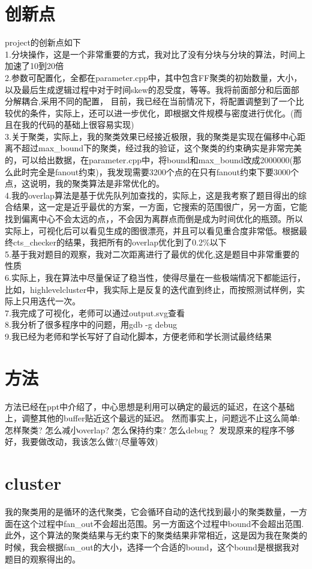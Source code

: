 \documentclass[12pt]{ctexart}
\begin{document}
\section{创新点}
project的创新点如下\\
1.分块操作，这是一个非常重要的方式，我对比了没有分块与分块的算法，时间上加速了10到20倍 \\
2.参数可配置化，全都在parameter.cpp中，其中包含FF聚类的初始数量，大小，以及最后生成逻辑过程中对于时间skew的忍受度，等等。我将前面部分和后面部分解耦合,采用不同的配置，
目前，我已经在当前情况下，将配置调整到了一个比较优的条件，实际上，还可以进一步优化，即根据文件规模与密度进行优化。(而且在我的代码的基础上很容易实现)\\
3.关于聚类，实际上，我的聚类效果已经接近极限，我的聚类是实现在偏移中心距离不超过max\_bound下的聚类，经过我的验证，这个聚类的约束确实是非常完美的，可以给出数据，在parameter.cpp中，将bound和max\_bound改成2000000(那么此时完全是fanout约束)，我发现需要3200个点的在只有fanout约束下要3000个点，这说明，我的聚类算法是非常优化的。\\
4.我的overlap算法是基于优先队列加查找的，实际上，这是我考察了题目得出的综合结果，这一定是近乎最优的方案，一方面，它搜索的范围很广，另一方面，它能找到偏离中心不会太远的点，，不会因为离群点而倒是成为时间优化的瓶颈。所以实际上，可视化后可以看见生成的图很漂亮，并且可以看见重合度非常低。根据最终cts\_checker的结果，我把所有的overlap优化到了0.2\%以下 \\
5.基于我对题目的观察，我对二次距离进行了最优的优化,这是题目中非常重要的性质    \\
6.实际上，我在算法中尽量保证了稳当性，使得尽量在一些极端情况下都能运行，比如，highlevelcluster中，我实际上是反复的迭代直到终止，而按照测试样例，实际上只用迭代一次。    \\
7.我完成了可视化，老师可以通过output.svg查看   \\
8.我分析了很多程序中的问题，用gdb -g debug    \\
9.我已经为老师和学长写好了自动化脚本，方便老师和学长测试最终结果 


\section{方法}
方法已经在ppt中介绍了，中心思想是利用可以确定的最远的延迟，在这个基础上，调整其他的buffer贴近这个最远的延迟。
然而事实上，问题远不止这么简单:
怎样聚类?
怎么减小overlap?
怎么保持约束?
怎么debug？
发现原来的程序不够好，我要做改动，我该怎么做?(尽量等效)
\section{cluster}
我的聚类用的是循环的迭代聚类，它会循环自动的迭代找到最小的聚类数量，一方面在这个过程中fan\_out不会超出范围。另一方面这个过程中bound不会超出范围.
此外，这个算法的聚类结果与无约束下的聚类结果非常相近，这是因为我在聚类的时候，我会根据fan\_out的大小，选择一个合适的bound，这个bound是根据我对题目的观察得出的。\\
\end{document}
